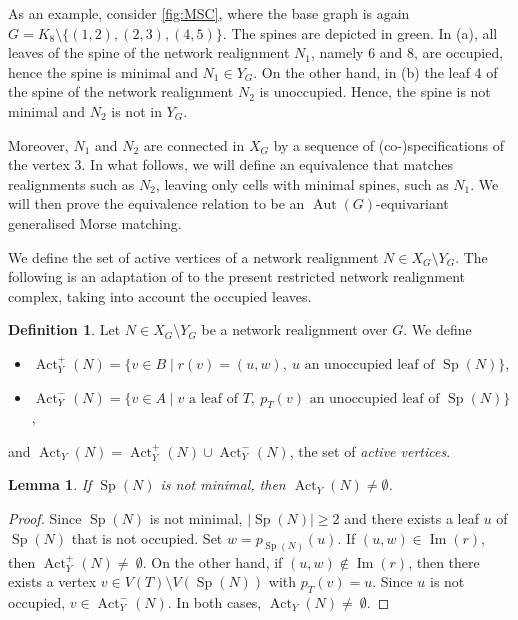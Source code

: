 \documentclass[reqno,dvipsnames]{amsart}
\theoremstyle{plain}
\newtheorem{lemma}[theorem]{Lemma}
\numberwithin{equation}{section}
\theoremstyle{definition}
\newtheorem{definition}[theorem]{Definition}
\DeclareMathOperator{\Act}{Act}
\DeclareMathOperator{\Image}{Im}
\DeclareMathOperator{\Sp}{Sp}
\DeclareMathOperator{\Aut}{Aut}
\begin{document}
As an example, consider \autoref{fig:MSC}, where the base graph is again $G=K_8 \setminus \{(1,2),(2,3),(4,5)\}$. The spines are depicted in green. In (a), all leaves of the spine of the network realignment $N_1$, namely 6 and 8, are occupied, hence the spine is minimal and $N_1\in Y_G$. On the other hand, in (b) the leaf 4 of the spine of the network realignment $N_2$ is unoccupied. Hence, the spine is not minimal and $N_2$ is not in $Y_G$.

Moreover, $N_1$ and $N_2$ are connected in $X_G$ by a sequence of (co-)specifications of the vertex 3. In what follows, we will define an equivalence that matches realignments such as $N_2$, leaving only cells with minimal spines, such as $N_1$. We will then prove the equivalence relation to be an $\Aut(G)$-equivariant generalised Morse matching. 

We define the set of active vertices of a network realignment $N\in X_G\setminus Y_G$. The following is an adaptation of \cite[Definition 4.13]{Kozlov25} to the present restricted network realignment complex, taking into account the occupied leaves. 

\begin{definition}
	Let $N\in X_G\setminus Y_G$ be a network realignment over $G$. We define
	\begin{itemize}
		\item $\Act_Y^+(N) = \{ v\in B\mid r(v)=(u,w), \> u \text{ an unoccupied leaf of }\Sp(N)\}$,
		\item $\Act_Y^-(N) = \{ v\in A\mid v \text{ a leaf of } T, \> p_T(v) \text{ an unoccupied leaf of } \Sp(N)\}$,
	\end{itemize}
	and $\Act_Y(N)=\Act_Y^+(N)\cup \Act_Y^-(N)$, the set of \textit{active vertices}.
\end{definition}

\begin{lemma}\label{lem:ActNonempty}
	If $\Sp(N)$ is not minimal, then $\Act_Y(N) \neq \emptyset$. 
\end{lemma}

\begin{proof}
	Since $\Sp(N)$  is not minimal, $|\Sp(N)|\geq 2$ and there exists a leaf $u$ of $\Sp(N)$ that is not occupied. Set $w = p_{\Sp(N)}(u)$. If $(u,w) \in \Image(r)$, then $\Act_Y^+(N) \neq~\emptyset$. On the other hand, if $(u,w) \notin \Image(r)$, then there exists a vertex $v\in V(T)\setminus V(\Sp(N))$ with $p_T(v)=u$. Since $u$ is not occupied, $v \in \Act_Y^-(N)$. In both cases, $\Act_Y(N) \neq~\emptyset$.
\end{proof}
\end{document}
